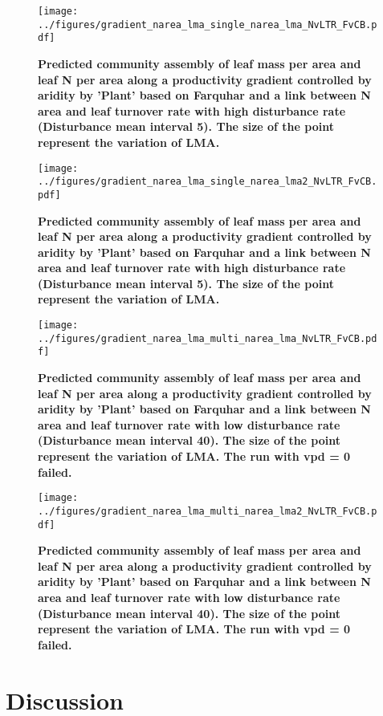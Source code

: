 \documentclass[a4paper,11pt]{article}
\begin{document}
\begin{figure}[ht]
\centering
\texttt{[image: ../figures/gradient\_narea\_lma\_single\_narea\_lma\_NvLTR\_FvCB.pdf]}
\caption{\textbf{Predicted community assembly of leaf mass per area and leaf N per area along a productivity gradient controlled by aridity by 'Plant' based on Farquhar and a link between N area and leaf turnover rate with high disturbance rate (Disturbance mean interval 5). The size of the point represent the variation of LMA.}
\label{fig:lma_nareaFh}}
\end{figure}

\begin{figure}[ht]
\centering
\texttt{[image: ../figures/gradient\_narea\_lma\_single\_narea\_lma2\_NvLTR\_FvCB.pdf]}
\caption{\textbf{Predicted community assembly of leaf mass per area and leaf N per area along a productivity gradient controlled by aridity by 'Plant' based on Farquhar and a link between N area and leaf turnover rate with high disturbance rate (Disturbance mean interval 5). The size of the point represent the variation of LMA.}
\label{fig:lma_nareaFh2}}
\end{figure}


\begin{figure}[ht]
\centering
\texttt{[image: ../figures/gradient\_narea\_lma\_multi\_narea\_lma\_NvLTR\_FvCB.pdf]}
\caption{\textbf{Predicted community assembly of leaf mass per area and leaf N per area along a productivity gradient controlled by aridity by 'Plant' based on Farquhar and a link between N area and leaf turnover rate with low disturbance rate (Disturbance mean interval 40). The size of the point represent the variation of LMA. The run with vpd = 0 failed.}
\label{fig:lma_nareaFl}}
\end{figure}

\begin{figure}[ht]
\centering
\texttt{[image: ../figures/gradient\_narea\_lma\_multi\_narea\_lma2\_NvLTR\_FvCB.pdf]}
\caption{\textbf{Predicted community assembly of leaf mass per area and leaf N per area along a productivity gradient controlled by aridity by 'Plant' based on Farquhar and a link between N area and leaf turnover rate with low disturbance rate (Disturbance mean interval 40). The size of the point represent the variation of LMA. The run with vpd = 0 failed.}
\label{fig:lma_nareaFl2}}
\end{figure}



\clearpage

\section{Discussion}
\end{document}
